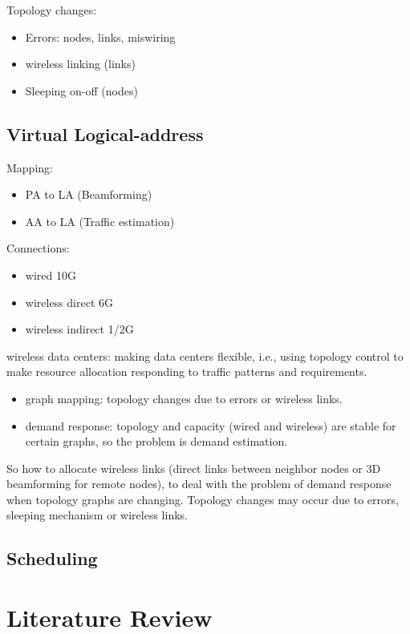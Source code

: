 \documentclass[journal,onecolumn,11pt]{IEEEtran}
\begin{document}
Topology changes:
\begin{itemize}
  \item Errors: nodes, links, miswiring
  \item wireless linking (links)
  \item Sleeping on-off (nodes)
\end{itemize}

\subsection{Virtual Logical-address}

Mapping:
\begin{itemize}
  \item PA to LA (Beamforming)
  \item AA to LA (Traffic estimation)
\end{itemize}

Connections:
\begin{itemize}
  \item wired 10G
  \item wireless direct 6G
  \item wireless indirect 1/2G
\end{itemize}

wireless data centers: making data centers flexible, i.e., using topology control to make resource allocation responding to traffic patterns and requirements.
\begin{itemize}
  \item graph mapping: topology changes due to errors or wireless links.
  \item demand response: topology and capacity (wired and wireless) are stable for certain graphs, so the problem is demand estimation.
\end{itemize}
So how to allocate wireless links (direct links between neighbor nodes or 3D beamforming for remote nodes), to deal with the problem of demand response when topology graphs are changing. Topology changes may occur due to errors, sleeping mechanism or wireless links.

\subsection{Scheduling}

\section{Literature Review}
\end{document}
